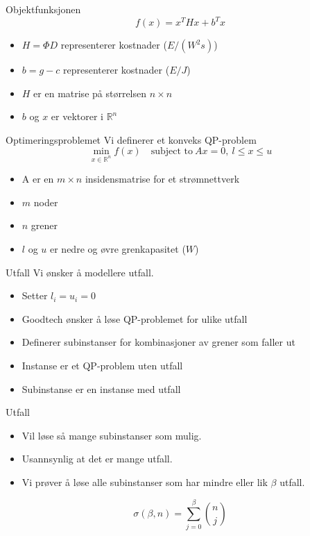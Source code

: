 \documentclass{beamer}
\begin{document}
\begin{frame}{Objektfunksjonen}
\[
f(x) = x^T H x + b^T x
\]
\begin{itemize}
\item $H = \Phi D$ representerer kostnader ($E/(W^2 s)$)
\item $b = g - c$ representerer kostnader ($E/J$)
\item $H$ er en matrise på størrelsen $n \times n$
\item $b$ og $x$ er vektorer i $\mathbb{R}^n$
\end{itemize}
\end{frame}



\begin{frame}{Optimeringsproblemet}
Vi definerer et konveks QP-problem
\[
\min_{x \in \mathbb{R}^n} f(x) \quad \textrm{subject to} ~ Ax = 0, ~ l \leq x \leq u
\]
\begin{itemize}
\item A er en $m \times n$ insidensmatrise for et strømnettverk
\item $m$ noder
\item $n$ grener
\item $l$ og $u$ er nedre og øvre grenkapasitet ($W$)
\end{itemize}
\end{frame}



\begin{frame}{Utfall}
Vi ønsker å modellere utfall.
\begin{itemize}
\item Setter $l_i = u_i = 0$
\item Goodtech ønsker å løse QP-problemet for ulike utfall
\item Definerer subinstanser for kombinasjoner av grener som faller ut
\item Instanse er et QP-problem uten utfall
\item Subinstanse er en instanse med utfall
\end{itemize}
\end{frame}



\begin{frame}{Utfall}
\begin{itemize}
\item Vil løse så mange subinstanser som mulig.
\item Usannsynlig at det er mange utfall.
\item Vi prøver å løse alle subinstanser som har mindre eller lik $\beta$ utfall.
\end{itemize}
\[
\sigma (\beta, n) = \sum_{j=0}^{\beta} \binom{n}{j}
\]
\end{frame}
\end{document}
